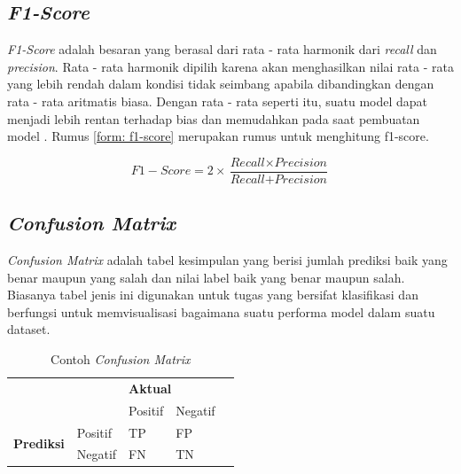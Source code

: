 \subsection{\textit{F1-Score}}

\textit{F1-Score} adalah besaran yang berasal dari rata - rata harmonik dari \textit{recall} dan \textit{precision}. Rata  - rata harmonik dipilih karena akan menghasilkan nilai rata - rata yang lebih rendah dalam kondisi tidak seimbang apabila dibandingkan dengan rata - rata aritmatis biasa. Dengan rata - rata seperti itu, suatu model dapat menjadi lebih rentan terhadap bias dan memudahkan pada saat pembuatan model \cite{metrics_ml}. Rumus \ref{form: f1-score} merupakan rumus untuk menghitung f1-score.

\begin{equation}
    \label{form: f1-score}
    F1-Score = 2 \times \frac{\textit{Recall} \times \textit{Precision}}{\textit{Recall} + \textit{Precision}}
\end{equation}

\subsection{\textit{Confusion Matrix}}

\textit{Confusion Matrix} adalah tabel kesimpulan yang berisi jumlah prediksi baik yang benar maupun yang salah dan nilai label baik yang benar maupun salah. Biasanya tabel jenis ini digunakan untuk tugas yang bersifat klasifikasi dan berfungsi untuk memvisualisasi bagaimana suatu performa model dalam suatu dataset.

\begin{table}
    \caption{Contoh \textit{Confusion Matrix}}
    \label{tab:cth_confusion_mtrx}
    \centering
    \begin{tabular}{|l|l|l|l|l}
        \cline{1-4}
        \multicolumn{2}{|l|}{\multirow{2}{*}{}} & \multicolumn{2}{l|}{\textbf{Aktual}} &                \\ \cline{3-4}
        \multicolumn{2}{|l|}{}                  & Positif                              & Negatif &      \\ \cline{1-4}
        \multirow{2}{*}{\textbf{Prediksi}}      & Positif                              & TP      & FP & \\ \cline{2-4}
                                                & Negatif                              & FN      & TN & \\ \cline{1-4}
    \end{tabular}
\end{table}

